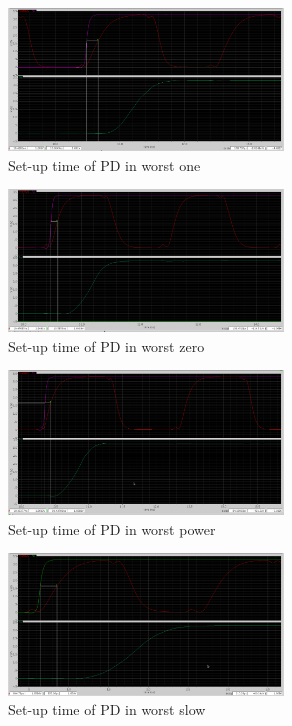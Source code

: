 \documentclass[a4paper,12pt]{article} \usepackage{graphicx}
\begin{document}
\begin{figure}[h]
  \centering
  \includegraphics[width=0.65\textwidth]{../Bilder/Layout/pd_wo.png}
  \caption{Set-up time of PD in worst one}
  \label{fig:PDwo}
\end{figure}

\begin{figure}[h]
  \centering
  \includegraphics[width=0.65\textwidth]{../Bilder/Layout/pd_wz.png}
  \caption{Set-up time of PD in worst zero}
  \label{fig:PDwz}
\end{figure}

\begin{figure}[h]
  \centering
  \includegraphics[width=0.65\textwidth]{../Bilder/Layout/pd_wp.png}
  \caption{Set-up time of PD in worst power}
  \label{fig:PDwp}
\end{figure}

\begin{figure}[h]
  \centering
  \includegraphics[width=0.65\textwidth]{../Bilder/Layout/pd_ws.png}
  \caption{Set-up time of PD in worst slow}
  \label{fig:PDws}
\end{figure}
\end{document}
